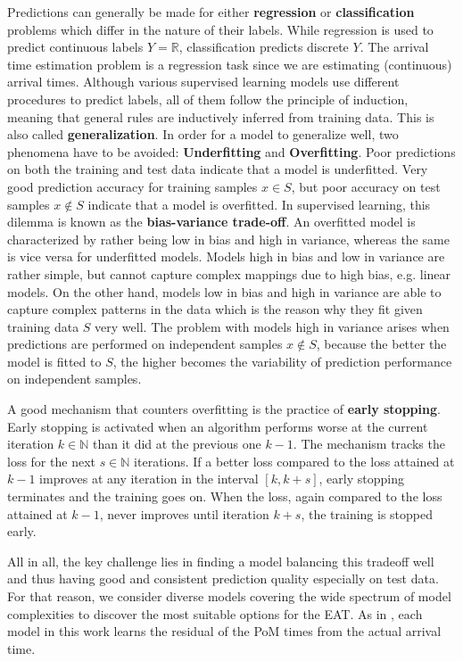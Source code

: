 Predictions can generally be made for either \textbf{regression} or \textbf{classification} problems which differ in the nature of their labels. 
While regression is used to predict continuous labels $ Y = \mathbb{R} $, classification predicts discrete $ Y $. The arrival time estimation problem is a regression task since we are estimating (continuous) arrival times.
Although various supervised learning models use different procedures to predict labels, all of them follow the principle of induction, meaning that general rules are inductively inferred from training data. This is also called \textbf{generalization}.  
In order for a model to generalize well, two phenomena have to be avoided: \textbf{Underfitting} and \textbf{Overfitting}. 
Poor predictions on both the training and test data indicate that a model is underfitted. Very good prediction accuracy for training samples $ x \in S $, but poor accuracy on test samples $ x \notin S $ indicate that a model is overfitted.
In supervised learning, this dilemma is known as the \textbf{bias-variance trade-off}. 
An overfitted model is characterized by rather being low in bias and high in variance, whereas the same is vice versa for underfitted models. Models high in bias and low in variance are rather simple, but cannot capture complex mappings due to high bias, e.g. linear models. On the other hand, models low in bias and high in variance are able to capture complex patterns in the data which is the reason why they fit given training data $ S $ very well. The problem with models high in variance arises when predictions are performed on independent samples $ x \notin S $, because the better the model is fitted to $ S $, the higher becomes the variability of prediction performance on independent samples. 

A good mechanism that counters overfitting is the practice of \textbf{early stopping}. Early stopping is activated when an algorithm performs worse at the current iteration $ k \in \mathbb{N} $ than it did at the previous one $ k-1 $. The mechanism tracks the loss for the next $ s \in \mathbb{N} $ iterations. If a better loss compared to the loss attained at $ k-1 $ improves at any iteration in the interval $ [k, k+s] $, early stopping terminates and the training goes on. When the loss, again compared to the loss attained at $ k-1 $, never improves until iteration $ k+s $, the training is stopped early.
 
All in all, the key challenge lies in finding a model balancing this tradeoff well and thus having good and consistent prediction quality especially on test data. For that reason, we consider diverse models covering the wide spectrum of model complexities to discover the most suitable options for the EAT. As in \cite{Hildebrandt2020_EAT}, each model in this work learns the residual of the PoM times from the actual arrival time.
 
